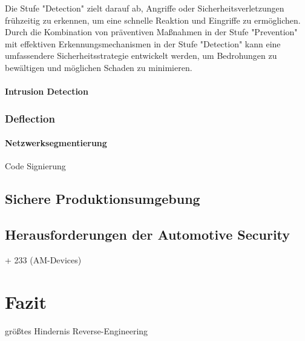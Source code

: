 Die Stufe "Detection" zielt darauf ab, Angriffe oder Sicherheitsverletzungen frühzeitig zu erkennen, um eine schnelle Reaktion und Eingriffe zu ermöglichen. Durch die Kombination von präventiven Maßnahmen in der Stufe "Prevention" mit effektiven Erkennungsmechanismen in der Stufe "Detection" kann eine umfassendere Sicherheitsstrategie entwickelt werden, um Bedrohungen zu bewältigen und möglichen Schaden zu minimieren.
\subsubsection{Intrusion Detection}
\cite[152]{Wurm.2022}


\subsection{Deflection}
\subsubsection{Netzwerksegmentierung}
\cite[144]{Wurm.2022}
Code Signierung \cite{MillerCharlie.2019}









\section{Sichere Produktionsumgebung}
\cite[219]{Wurm.2022}

\section{Herausforderungen der Automotive Security}
\cite[36]{Wurm.2022} + 233 (AM-Devices)




\chapter{Fazit}
größtes Hindernis Reverse-Engineering